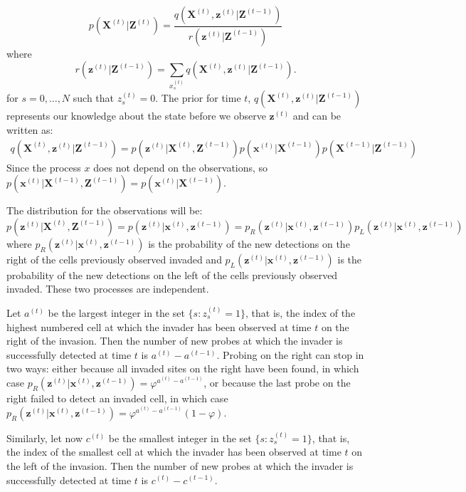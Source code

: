 \documentclass[11pt,a4paper]{article}
\renewcommand{\vec}[1]{\mathbf{#1}}
\begin{document}
\[
    p(\vec{X}^{(t)} | \vec{Z}^{(t)})  =  \frac{q(\vec{X}^{(t)}, \vec{z}^{(t)} | \vec{Z}^{(t-1)})}{r(\vec{z}^{(t)} | \vec{Z}^{(t-1)})}
\]
where 
\[
    r(\vec{z}^{(t)} | \vec{Z}^{(t-1)}) = \sum_{x_s^{(t)}} q(\vec{X}^{(t)}, \vec{z}^{(t)} | \vec{Z}^{(t-1)}).
\]
for $s = 0, \dots, N$ such that $z_s^{(t)}=0$.
The prior for time $t$, $q(\vec{X}^{(t)}, \vec{z}^{(t)} | \vec{Z}^{(t-1)})$ represents our knowledge about the state before we observe $\vec{z}^{(t)}$ and can be written as:
\begin{align}
    q(\vec{X}^{(t)}, \vec{z}^{(t)} | \vec{Z}^{(t-1)}) = p(\vec{z}^{(t)} | \vec{X}^{(t)}, \vec{Z}^{(t-1)}) p(\vec{x}^{(t)} | \vec{X}^{(t-1)}) p(\vec{X}^{(t-1)} | \vec{Z}^{(t-1)})
    \label{eq:1}
\end{align}
Since the process $x$ does not depend on the observations, so $p(\vec{x}^{(t)} | \vec{X}^{(t-1)}, \vec{Z}^{(t-1)}) = p(\vec{x}^{(t)} | \vec{X}^{(t-1)})$.

The distribution for the observations will be:
\[
    p(\vec{z}^{(t)} | \vec{X}^{(t)}, \vec{Z}^{(t-1)}) = p(\vec{z}^{(t)} | \vec{x}^{(t)}, \vec{z}^{(t-1)}) = p_R(\vec{z}^{(t)} | \vec{x}^{(t)}, \vec{z}^{(t-1)}) p_L(\vec{z}^{(t)} | \vec{x}^{(t)}, \vec{z}^{(t-1)})
\]
where $p_R(\vec{z}^{(t)} | \vec{x}^{(t)}, \vec{z}^{(t-1)})$ is the probability of the new detections on the right of the cells previously observed invaded and $p_L(\vec{z}^{(t)} | \vec{x}^{(t)}, \vec{z}^{(t-1)})$ is the probability of the new detections on the left of the cells previously observed invaded. These two processes are independent.

Let $a^{(t)}$ be the largest integer in the set $\{ s : z_s^{(t)} = 1 \}$, that is, the index of the highest numbered cell at which the invader has been observed at time $t$ on the right of the invasion. Then the number of new probes at which the invader is successfully detected at time $t$ is $a^{(t)} - a^{(t-1)}$. Probing on the right can stop in two ways: either because all invaded sites on the right have been found, in which case $p_R(\vec{z}^{(t)} | \vec{x}^{(t)}, \vec{z}^{(t-1)}) = \varphi^{a^{(t)} - a^{(t-1)}}$, or because the last probe on the right failed to detect an invaded cell, in which case $p_R(\vec{z}^{(t)} | \vec{x}^{(t)}, \vec{z}^{(t-1)}) = \varphi^{a^{(t)} - a^{(t-1)}} (1 - \varphi)$.

Similarly, let now $c^{(t)}$ be the smallest integer in the set $\{ s : z_s^{(t)} = 1 \}$, that is, the index of the smallest cell at which the invader has been observed at time $t$ on the left of the invasion. Then the number of new probes at which the invader is successfully detected at time $t$ is $c^{(t)} - c^{(t-1)}$.
\end{document}
